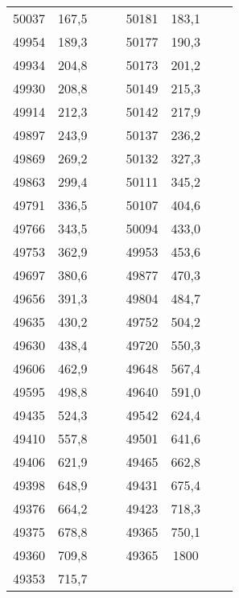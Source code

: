 \documentclass[11pt]{article}
\begin{document}
{{\begin{tabular}{|c|c|c|c|c|c|c|c|}
            \cline{1-6} 
            50037 & 167,5 &  &  & 50181 & 183,1 &  & \tabularnewline
            \cline{1-2} \cline{5-6} 
            49954 & 189,3 &  &  & 50177 & 190,3 &  & \tabularnewline
            \cline{1-2} \cline{5-6} 
            49934 & 204,8 &  &  & 50173 & 201,2 &  & \tabularnewline
            \cline{1-2} \cline{5-6} 
            49930 & 208,8 &  &  & 50149 & 215,3 &  & \tabularnewline
            \cline{1-2} \cline{5-6} 
            49914 & 212,3 &  &  & 50142 & 217,9 &  & \tabularnewline
            \cline{1-2} \cline{5-6} 
            49897 & 243,9 &  &  & 50137 & 236,2 &  & \tabularnewline
            \cline{1-2} \cline{5-6} 
            49869 & 269,2 &  &  & 50132 & 327,3 &  & \tabularnewline
            \cline{1-2} \cline{5-6} 
            49863 & 299,4 &  &  & 50111 & 345,2 &  & \tabularnewline
            \cline{1-2} \cline{5-6} 
            49791 & 336,5 &  &  & 50107 & 404,6 &  & \tabularnewline
            \cline{1-2} \cline{5-6} 
            49766 & 343,5 &  &  & 50094 & 433,0 &  & \tabularnewline
            \cline{1-2} \cline{5-6} 
            49753 & 362,9 &  &  & 49953 & 453,6 &  & \tabularnewline
            \cline{1-2} \cline{5-6} 
            49697 & 380,6 &  &  & 49877 & 470,3 &  & \tabularnewline
            \cline{1-2} \cline{5-6} 
            49656 & 391,3 &  &  & 49804 & 484,7 &  & \tabularnewline
            \cline{1-2} \cline{5-6} 
            49635 & 430,2 &  &  & 49752 & 504,2 &  & \tabularnewline
            \cline{1-2} \cline{5-6} 
            49630 & 438,4 &  &  & 49720 & 550,3 &  & \tabularnewline
            \cline{1-2} \cline{5-6} 
            49606 & 462,9 &  &  & 49648 & 567,4 &  & \tabularnewline
            \cline{1-2} \cline{5-6} 
            49595 & 498,8 &  &  & 49640 & 591,0 &  & \tabularnewline
            \cline{1-2} \cline{5-6} 
            49435 & 524,3 &  &  & 49542 & 624,4 &  & \tabularnewline
            \cline{1-2} \cline{5-6} 
            49410 & 557,8 &  &  & 49501 & 641,6 &  & \tabularnewline
            \cline{1-2} \cline{5-6} 
            49406 & 621,9 &  &  & 49465 & 662,8 &  & \tabularnewline
            \cline{1-2} \cline{5-6} 
            49398 & 648,9 &  &  & 49431 & 675,4 &  & \tabularnewline
            \cline{1-2} \cline{5-6} 
            49376 & 664,2 &  &  & 49423 & 718,3 &  & \tabularnewline
            \cline{1-2} \cline{5-6} 
            49375 & 678,8 &  &  & 49365 & 750,1 &  & \tabularnewline
            \cline{1-2} \cline{5-6} 
            49360 & 709,8 &  &  & 49365 & 1800 &  & \tabularnewline
            \cline{1-2} \cline{5-6} 
            49353 & 715,7 &  & \multicolumn{1}{c}{} & \multicolumn{1}{c}{} & \multicolumn{1}{c}{} &  & \tabularnewline

\end{tabular}}}
\end{document}
